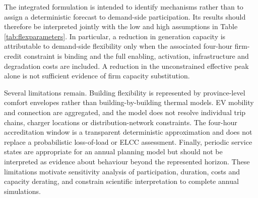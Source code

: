 \documentclass[12pt]{article}
\begin{document}
The integrated formulation is intended to identify mechanisms rather than to
assign a deterministic forecast to demand-side participation. Its results
should therefore be interpreted jointly with the low and high assumptions in
Table \ref{tab:flexparameters}. In particular, a reduction in generation
capacity is attributable to demand-side flexibility only when the associated
four-hour firm-credit constraint is binding and the full enabling,
activation, infrastructure and degradation costs are included. A reduction
in the unconstrained effective peak alone is not sufficient evidence of firm
capacity substitution.

Several limitations remain. Building flexibility is represented by
province-level comfort envelopes rather than building-by-building thermal
models. EV mobility and connection are aggregated, and the model does not
resolve individual trip chains, charger locations or distribution-network
constraints. The four-hour accreditation window is a transparent
deterministic approximation and does not replace a probabilistic
loss-of-load or ELCC assessment. Finally, periodic service states are
appropriate for an annual planning model but should not be interpreted as
evidence about behaviour beyond the represented horizon. These limitations
motivate sensitivity analysis of participation, duration, costs and capacity
derating, and constrain scientific interpretation to complete annual
simulations.

{\small\sloppy}
\end{document}
